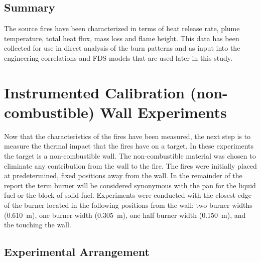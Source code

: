 \documentclass[twoside]{uocthesis}
\begin{document}
{{\section{Summary}

The source fires have been characterized in terms of heat release rate, plume temperature, total heat flux, mass loss and flame height.  This data has been collected for use in direct analysis of the burn patterns and as input into the engineering correlations and FDS models that are used later in this study.



\chapter{Instrumented Calibration (non-combustible) Wall Experiments}

Now that the characteristics of the fires have been measured, the next step is to measure the thermal impact that the fires have on a target.  In these experiments the target is a non-combustible wall. The non-combustible material was chosen to eliminate any contribution from the wall to the fire.  The fires were initially placed at predetermined, fixed positions away from the wall.  In the remainder of the report the term burner will be considered synonymous with the pan for the liquid fuel or the block of solid fuel. Experiments were conducted with the closest edge of the burner located in the following positions from the wall: two burner widths (0.610~m), one burner width (0.305~m), one half burner width (0.150~m), and the touching the wall.


\section{Experimental Arrangement}

}}
\end{document}
